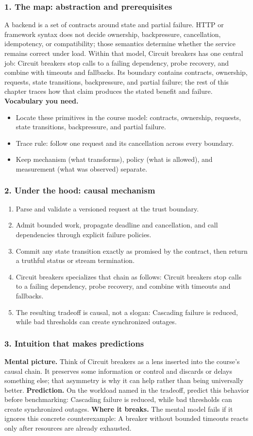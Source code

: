 \subsubsection*{1. The map: abstraction and prerequisites}
A backend is a set of contracts around state and partial failure. HTTP or framework syntax does not decide ownership, backpressure, cancellation, idempotency, or compatibility; those semantics determine whether the service remains correct under load.
Within that model, Circuit breakers has one central job: Circuit breakers stop calls to a failing dependency, probe recovery, and combine with timeouts and fallbacks. Its boundary contains contracts, ownership, requests, state transitions, backpressure, and partial failure; the rest of this chapter traces how that claim produces the stated benefit and failure.
\textbf{Vocabulary you need.}\begin{itemize}
\item Locate these primitives in the course model: contracts, ownership, requests, state transitions, backpressure, and partial failure.
\item Trace rule: follow one request and its cancellation across every boundary.
\item Keep mechanism (what transforms), policy (what is allowed), and measurement (what was observed) separate.
\end{itemize}
\subsubsection*{2. Under the hood: causal mechanism}\begin{enumerate}
\item Parse and validate a versioned request at the trust boundary.
\item Admit bounded work, propagate deadline and cancellation, and call dependencies through explicit failure policies.
\item Commit any state transition exactly as promised by the contract, then return a truthful status or stream termination.
\item Circuit breakers specializes that chain as follows: Circuit breakers stop calls to a failing dependency, probe recovery, and combine with timeouts and fallbacks.
\item The resulting tradeoff is causal, not a slogan: Cascading failure is reduced, while bad thresholds can create synchronized outages.
\end{enumerate}
\subsubsection*{3. Intuition that makes predictions}
\textbf{Mental picture.} Think of Circuit breakers as a lens inserted into the course's causal chain. It preserves some information or control and discards or delays something else; that asymmetry is why it can help rather than being universally better.
\textbf{Prediction.} On the workload named in the tradeoff, predict this behavior before benchmarking: Cascading failure is reduced, while bad thresholds can create synchronized outages.
\textbf{Where it breaks.} The mental model fails if it ignores this concrete counterexample: A breaker without bounded timeouts reacts only after resources are already exhausted.
